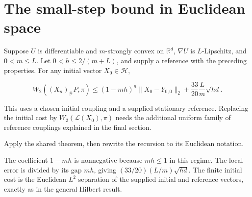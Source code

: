 \documentclass[11pt,a4paper]{article}
\begin{document}
\section{\texorpdfstring{The small-step bound in Euclidean space}{The small-step bound in Euclidean space}}


Suppose \(U\) is differentiable and \(m\)-strongly convex on \(\mathbb R^d\), \(\nabla U\) is \(L\)-Lipschitz, and \(0<m\le L\). Let \(0<h\le2/(m+L)\), and supply a reference with the preceding properties. For any initial vector \(X_0\in\mathcal H\),

\[W_2((X_n)_\#P,\pi)\le(1-mh)^n\|X_0-Y_{0,0}\|_2+\frac{33}{20}\frac Lm\sqrt{hd}.\]

This uses a chosen initial coupling and a supplied stationary reference. Replacing the initial cost by \(W_2(\mathcal L(X_0),\pi)\) needs the additional uniform family of reference couplings explained in the final section.



Apply the shared theorem, then rewrite the recursion to its Euclidean notation.



The coefficient \(1-mh\) is nonnegative because \(mh\le1\) in this regime. The local error is divided by its gap \(mh\), giving \((33/20)(L/m)\sqrt{hd}\). The finite initial cost is the Euclidean \(L^2\) separation of the supplied initial and reference vectors, exactly as in the general Hilbert result.
\end{document}
